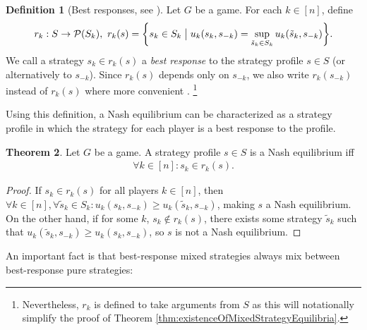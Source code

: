 \documentclass[a4paper,DIV=11,abstracton,twoside=semi]{scrreprt}
\theoremstyle{definition}
\newtheorem{thm}{Theorem}[chapter] %
\newtheorem{defn}[thm]{Definition} %
\begin{document}
    \begin{defn}[Best responses, see \cite{bib:fudenbergGameTheory}]
        Let $G$ be a game. For each $k \in [n]$, define
        \begin{gather*} 
            r_k: S \to \operatorname{\mathcal{P}}(S_k),~ r_k(s) = \biggl\{s_k \in S_k \bigm\vert u_k(s_k, s_{-k}) = \sup_{\tilde{s}_k \in S_k} u_k(\tilde{s}_k, s_{-k}) \biggr\}.
        \end{gather*} 
        We call a strategy $s_k \in r_k(s)$ a \emph{best response} to the strategy profile $s \in S$ (or alternatively to $s_{-k}$).
        Since $r_k(s)$ depends only on $s_{-k}$, we also write $r_k(s_{-k})$ instead of $r_k(s)$ where more convenient \cite{bib:fudenbergGameTheory}.
        \footnote{Nevertheless, $r_k$ is defined to take arguments from $S$ as this will notationally simplify the proof of Theorem \ref{thm:existenceOfMixedStrategyEquilibria}.}
    \end{defn}
%    
    Using this definition, a Nash equilibrium can be characterized as a strategy profile in which the strategy for each player is a best response to the profile.
%    
    \begin{thm}
        \label{thm:nashEquilibriumCharacterizationByBestResponses}
        Let $G$ be a game. A strategy profile $s \in S$ is a Nash equilibrium iff 
        \begin{gather*}
            \forall k \in [n]: s_k \in r_k(s).
        \end{gather*}
    \end{thm}
    \begin{proof}
        If $s_k \in r_k(s)$ for all players $k \in [n]$, then $\forall k \in [n], \forall \tilde{s}_k \in S_k: u_k(s_k, s_{-k}) \geq u_k(\tilde{s}_k, s_{-k})$, making $s$ a Nash equilibrium.
        On the other hand, if for some $k$, $s_k \notin r_k(s)$, there exists some strategy $\tilde{s}_k$
        such that $u_k(\tilde{s}_k, s_{-k}) \geq u_k(s_k, s_{-k})$,
        so $s$ is not a Nash equilibrium.
    \end{proof}

    An important fact is that best-response mixed strategies always mix between best-response pure strategies:
\end{document}
